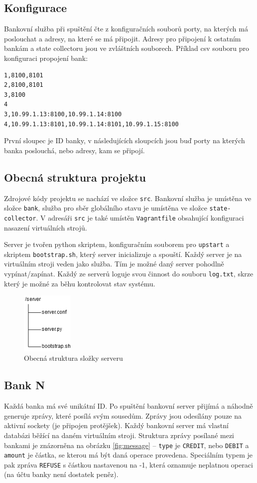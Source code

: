 \documentclass[11pt,a4paper]{scrartcl}
\begin{document}
	\subsection{Konfigurace}
	Bankovní služba při spuštění čte z konfiguračních souborů porty, na kterých má poslouchat a adresy, na které se má připojit. Adresy pro připojení k ostatním bankám a state collectoru jsou ve zvláštních souborech. Příklad csv souboru pro konfiguraci propojení bank:
	
	\begin{verbatim}
1,8100,8101
2,8100,8101
3,8100
4
3,10.99.1.13:8100,10.99.1.14:8100
4,10.99.1.13:8101,10.99.1.14:8101,10.99.1.15:8100
	\end{verbatim}
	
	První sloupec je ID banky, v následujících sloupcích jsou buď porty na kterých banka poslouchá, nebo adresy, kam se připojí.
	
	\subsection{Obecná struktura projektu}
	Zdrojové kódy projektu se nachází ve složce \verb|src|. Bankovní služba je umístěna ve složce \verb|bank|, služba pro sběr globálního stavu je umístěna ve složce \verb|state-collector|. V adresáři \verb|src| je také umístěn \verb|Vagrantfile| obsahující konfiguraci nasazení virtuálních strojů. 
	
	Server je tvořen python skriptem, konfiguračním souborem pro \verb|upstart| a skriptem \verb|bootstrap.sh|, který server inicializuje a spouští. Každý server je na virtuálním stroji veden jako služba. Tím je možné daný server pohodlně vypínat/zapínat. 	Každý ze serverů loguje svou činnost do souboru \verb|log.txt|, skrze který je možné za běhu kontrolovat stav systému. 
	
	\begin{figure}[H]
		\centering
		\includegraphics[width=2.5cm]{img/server-structure.png}
		\caption{Obecná struktura složky serveru}
		\label{fig:serv-struct}
	\end{figure}
	
	\subsection{Bank N}
	Každá banka má své unikátní ID. Po spuštění bankovní server přijímá a náhodně generuje zprávy, které posílá svým sousedům. Zprávy jsou odesílány pouze na aktivní sockety (je připojen protějšek). Každý bankovní server má vlastní databázi běžící na daném virtuálním stroji. Struktura zprávy posílané mezi bankami je znázorněna na obrázku \ref{fig:message} -- \verb|type| je \verb|CREDIT|, nebo \verb|DEBIT| a \verb|amount| je částka, se kterou má být daná operace provedena. Speciálním typem je pak zpráva \verb|REFUSE| s částkou nastavenou na -1, která oznamuje neplatnou operaci (na účtu banky není dostatek peněz).
	
\end{document}
